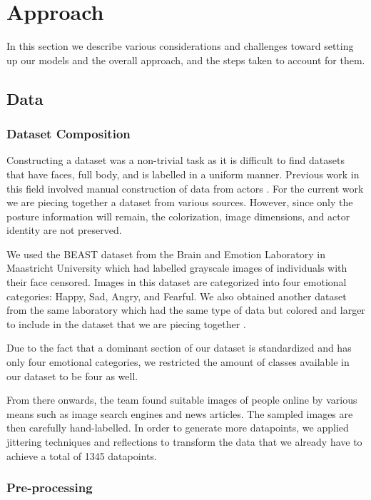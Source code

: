 \documentclass{article}
\begin{document}
\section{Approach}

In this section we describe various considerations and challenges toward setting up our models and the overall approach, and the steps taken to account for them.

\subsection{Data}

\subsubsection{Dataset Composition}
Constructing a dataset was a non-trivial task as it is difficult to find datasets that have faces, full body, and is labelled in a uniform manner. Previous work in this field involved manual construction of data from actors \citep{schindler2008recognizing}. For the current work we are piecing together a dataset from various sources. However, since only the posture information will remain, the colorization, image dimensions, and actor identity are not preserved.

We used the BEAST dataset \citep{de2011bodily} from the Brain and Emotion Laboratory in Maastricht University which had labelled grayscale images of individuals with their face censored. Images in this dataset are categorized into four emotional categories: Happy, Sad, Angry, and Fearful. We also obtained another dataset from the same laboratory which had the same type of data but colored and larger to include in the dataset that we are piecing together \citep{stienen2012computational}.

Due to the fact that a dominant section of our dataset is standardized and has only four emotional categories, we restricted the amount of classes available in our dataset to be four as well.

From there onwards, the team found suitable images of people online by various means such as image search engines and news articles. The sampled images are then carefully hand-labelled. In order to generate more datapoints, we applied jittering techniques and reflections to transform the data that we already have to achieve a total of 1345 datapoints.

\subsubsection{Pre-processing}
\end{document}
